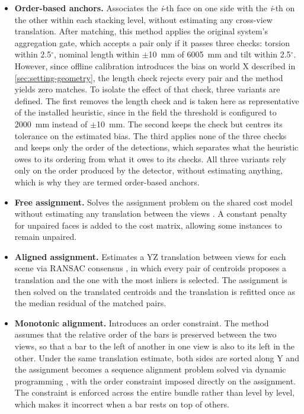 \documentclass[a4paper, 12pt, twoside]{book}
\newcommand{\citev}[1]{\citeauthor{#1} \citeyear{#1} \cite{#1}}
\begin{document}
\begin{itemize}
\item \textbf{Order-based anchors.} Associates the \textit{i}-th face on one side with the \textit{i}-th on the other within each stacking level, without estimating any cross-view translation. After matching, this method applies the original system's aggregation gate, which accepts a pair only if it passes three checks: torsion within 2.5$^\circ$, nominal length within $\pm$10~mm of 6005~mm and tilt within 2.5$^\circ$. However, since offline calibration introduces the bias on world X described in \cref{sec:setting-geometry}, the length check rejects every pair and the method yields zero matches. To isolate the effect of that check, three variants are defined. The first removes the length check and is taken here as representative of the installed heuristic, since in the field the threshold is configured to 2000~mm instead of $\pm$10~mm. The second keeps the check but centres its tolerance on the estimated bias. The third applies none of the three checks and keeps only the order of the detections, which separates what the heuristic owes to its ordering from what it owes to its checks. All three variants rely only on the order produced by the detector, without estimating anything, which is why they are termed order-based anchors.
\item \textbf{Free assignment.} Solves the assignment problem on the shared cost model without estimating any translation between the views \citev{kuhn1955}. A constant penalty for unpaired faces is added to the cost matrix, allowing some instances to remain unpaired.
\item \textbf{Aligned assignment.} Estimates a YZ translation between views for each scene via RANSAC consensus \citev{fischler1981}, in which every pair of centroids proposes a translation and the one with the most inliers is selected. The assignment is then solved on the translated centroids and the translation is refitted once as the median residual of the matched pairs.
\item \textbf{Monotonic alignment.} Introduces an order constraint. The method assumes that the relative order of the bars is preserved between the two views, so that a bar to the left of another in one view is also to its left in the other. Under the same translation estimate, both sides are sorted along Y and the assignment becomes a sequence alignment problem solved via dynamic programming \citev{ohta1985}, with the order constraint imposed directly on the assignment. The constraint is enforced across the entire bundle rather than level by level, which makes it incorrect when a bar rests on top of others.

\end{itemize}
\end{document}
